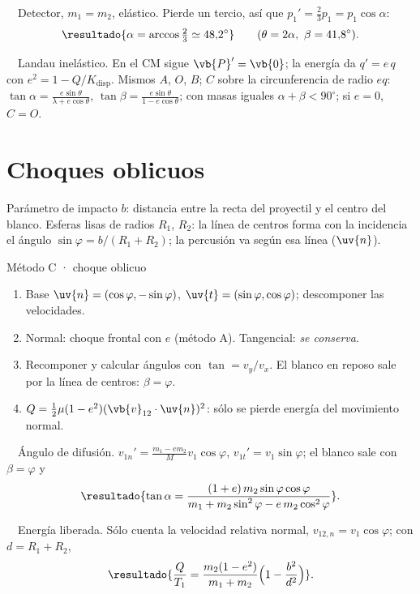 \documentclass[11pt,a4paper,twoside]{article}
\newcommand{\vrel}{\vb{v}_{12}}
\newcommand{\ej}[2]{\par\addvspace{1.2ex}\noindent{\color{cian}\bfseries P#1}\ \ {\color{tenue}#2.}\enspace\ignorespaces}
\begin{document}
\ej{8}{Detector, $m_{1}=m_{2}$, elástico}
Pierde un tercio, así que $p_{1}'=\frac23p_{1}=p_{1}\cos\alpha$:
\[
  \resultado{\alpha=\arccos\tfrac23\simeq48{,}2^{\circ}}\qquad(\theta=2\alpha,\ \beta=41{,}8^{\circ}).
\]

\ej{9}{Landau inelástico}
En el CM sigue $\vb{P}'=\vb{0}$; la energía da $q'=e\,q$ con $e^{2}=1-Q/K_{\text{disp}}$. Mismos $A$, $O$, $B$; $C$ sobre la
circunferencia de radio $eq$: $\tan\alpha=\frac{e\sin\theta}{\lambda+e\cos\theta}$, $\tan\beta=\frac{e\sin\theta}{1-e\cos\theta}$; con masas
iguales $\alpha+\beta<90^{\circ}$; si $e=0$, $C=O$.

\section{Choques oblicuos}

Parámetro de impacto $b$: distancia entre la recta del proyectil y el centro del blanco. Esferas lisas de
radios $R_{1}$, $R_{2}$: la línea de centros forma con la incidencia el ángulo $\sin\varphi=b/(R_{1}+R_{2})$; la
percusión va según esa línea ($\uv{n}$).

\begin{clave}{Método C · choque oblicuo}
\begin{enumerate}[leftmargin=1.4em]
  \item Base $\uv{n}=(\cos\varphi,-\sin\varphi)$, $\uv{t}=(\sin\varphi,\cos\varphi)$; descomponer las velocidades.
  \item Normal: choque frontal con $e$ (método A). Tangencial: \emph{se conserva}.
  \item Recomponer y calcular ángulos con $\tan=v_{y}/v_{x}$. El blanco en reposo sale por la línea de centros: $\beta=\varphi$.
  \item $Q=\tfrac12\mu(1-e^{2})(\vrel\cdot\uv{n})^{2}$: sólo se pierde energía del movimiento normal.
\end{enumerate}
\end{clave}

\ej{2}{Ángulo de difusión}
$v_{1n}'=\frac{m_{1}-em_{2}}{M}v_{1}\cos\varphi$, $v_{1t}'=v_{1}\sin\varphi$; el blanco sale con $\beta=\varphi$ y
\[
  \resultado{\tan\alpha=\frac{(1+e)\,m_{2}\sin\varphi\cos\varphi}{m_{1}+m_{2}\sin^{2}\varphi-e\,m_{2}\cos^{2}\varphi}} .
\]

\ej{5}{Energía liberada}
Sólo cuenta la velocidad relativa normal, $v_{12,n}=v_{1}\cos\varphi$; con $d=R_{1}+R_{2}$,
\[
  \resultado{\frac{Q}{T_{1}}=\frac{m_{2}(1-e^{2})}{m_{1}+m_{2}}\Bigl(1-\frac{b^{2}}{d^{2}}\Bigr)} .
\]
\end{document}
